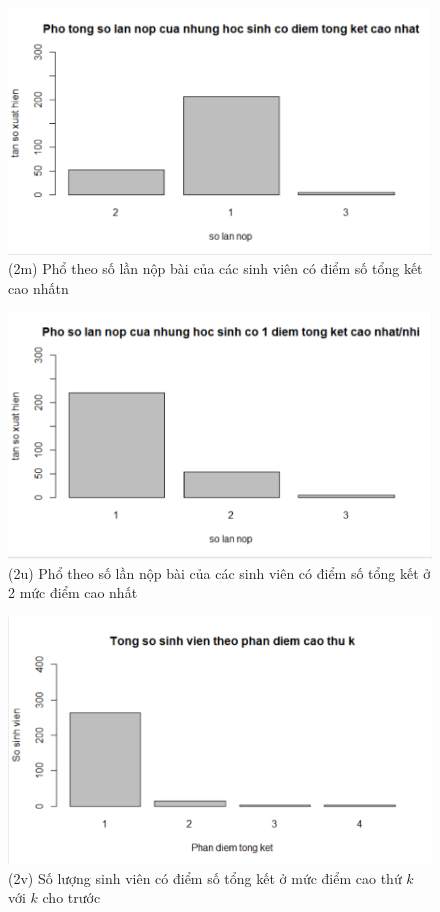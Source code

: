 \documentclass[a4paper]{article}
\theoremstyle{definition}
\begin{document}
\begin{figure}[!ht]
    \centering
    \includegraphics[scale=0.4]{Pics/q2m-file2.PNG}
    \caption{(2m) Phổ theo số lần nộp bài của các sinh viên có điểm số tổng kết cao nhấtn}
    \label{fig:my_label}
\end{figure}
\begin{figure}[!ht]
    \centering
    \includegraphics[scale=0.4]{Pics/q2u-file2.PNG}
    \caption{(2u) Phổ theo số lần nộp bài của các sinh viên có điểm số tổng kết ở 2 mức điểm cao nhất}
    \label{fig:my_label}
\end{figure}
\newpage 
\begin{figure}[!ht]
    \centering
    \includegraphics[scale=0.4]{Pics/q2v-file2.PNG}
    \caption{(2v) Số lượng sinh viên có điểm số tổng kết ở mức điểm cao thứ $k$ với $k$ cho trước}
    \label{fig:my_label}
\end{figure}
\end{document}
